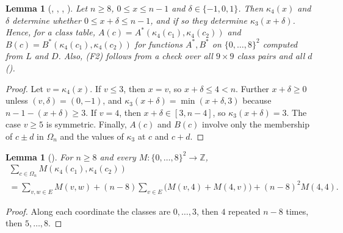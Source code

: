 \documentclass[11pt]{amsart}
\theoremstyle{plain}
\newtheorem{lemma}[theorem]{Lemma}
\theoremstyle{definition}
\newcommand{\Z}{\mathbb{Z}}
\begin{document}
\begin{lemma}[, , , ]\label{lem:classes}
Let $n\ge8$, $0\le x\le n-1$ and $\delta\in\{-1,0,1\}$. Then $\kappa_4(x)$ and $\delta$ determine whether $0\le x+\delta\le n-1$, and if so they determine $\kappa_3(x+\delta)$. Hence, for a class table, $A(c)=A^*(\kappa_4(c_1),\kappa_4(c_2))$ and $B(c)=B^*(\kappa_4(c_1),\kappa_4(c_2))$ for functions $A^*,B^*$ on $\{0,\dots,8\}^2$ computed from $L$ and $D$. Also, (F2) follows from a check over all $9\times9$ class pairs and all $d$ \textup{()}.
\end{lemma}
\begin{proof}
Let $v=\kappa_4(x)$. If $v\le3$, then $x=v$, so $x+\delta\le4<n$. Further $x+\delta\ge0$ unless $(v,\delta)=(0,-1)$, and $\kappa_3(x+\delta)=\min(x+\delta,3)$ because $n-1-(x+\delta)\ge3$. If $v=4$, then $x+\delta\in[3,n-4]$, so $\kappa_3(x+\delta)=3$. The case $v\ge5$ is symmetric. Finally, $A(c)$ and $B(c)$ involve only the membership of $c\pm d$ in $\Omega_n$ and the values of $\kappa_3$ at $c$ and $c+d$.
\end{proof}

\begin{lemma}[]\label{lem:count}
For $n\ge8$ and every $M\colon\{0,\dots,8\}^2\to\Z$,
\begin{multline*}
\textstyle\sum_{c\in\Omega_n}M(\kappa_4(c_1),\kappa_4(c_2))\\
\textstyle=\sum_{v,w\in E}M(v,w)+(n-8)\sum_{v\in E}\bigl(M(v,4)+M(4,v)\bigr)+(n-8)^2M(4,4).
\end{multline*}
\end{lemma}
\begin{proof}
Along each coordinate the classes are $0,\dots,3$, then $4$ repeated $n-8$ times, then $5,\dots,8$.
\end{proof}
\end{document}
